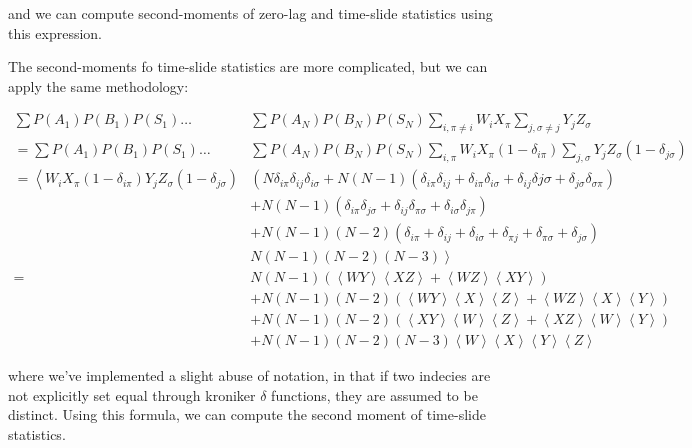 \documentclass{article}
\newcommand{\e}[1]{\left<#1\right>}
\begin{document}
and we can compute second-moments of zero-lag and time-slide statistics using this expression.

The second-moments fo time-slide statistics are more complicated, but we can apply the same methodology:

\begin{subequations}
	\begin{align}
		\sum P(A_1) P(B_1) P(S_1) \ldots & \sum P(A_N) P(B_N) P(S_N) \sum_{i,\pi\neq i} W_i X_\pi \sum_{j,\sigma\neq j} Y_j Z_\sigma \nonumber \\
		= \sum P(A_1) P(B_1) P(S_1) \ldots & \sum P(A_N) P(B_N) P(S_N) \sum_{i,\pi} W_i X_\pi \left(1-\delta_{i\pi}\right) \sum_{j,\sigma} Y_j Z_\sigma \left(1-\delta_{j\sigma}\right) \nonumber \\
		= \left< W_i X_\pi \left(1-\delta_{i\pi}\right) Y_j Z_\sigma \left(1-\delta_{j\sigma}\right) \right. & \left( N \delta_{i\pi}\delta_{ij}\delta_{i\sigma} + N\left(N-1\right)\left( \delta_{i\pi}\delta_{ij} + \delta_{i\pi}\delta_{i\sigma} + \delta_{ij}\delta{j\sigma} + \delta_{j\sigma}\delta_{\sigma\pi}\right) \right. \nonumber \\
                                      & + N\left(N-1\right)\left(\delta_{i\pi}\delta_{j\sigma} + \delta_{ij}\delta_{\pi\sigma} + \delta_{i\sigma}\delta_{j\pi} \right) \nonumber \\
                                      & + N\left(N-1\right)\left(N-2\right)\left( \delta_{i\pi} + \delta_{ij} + \delta_{i\sigma} + \delta_{\pi j} + \delta_{\pi\sigma} + \delta_{j\sigma} \right) \nonumber \\
                                      & \left. N\left(N-1\right)\left(N-2\right)\left(N-3\right) \right> \nonumber \\
		= & N\left(N-1\right)\left( \e{WY}\e{XZ} + \e{WZ}\e{XY} \right) \nonumber \\
                  & + N\left(N-1\right)\left(N-2\right) \left( \e{WY}\e{X}\e{Z} + \e{WZ}\e{X}\e{Y} \right) \nonumber \\
		  & + N\left(N-1\right)\left(N-2\right) \left( \e{XY}\e{W}\e{Z} + \e{XZ}\e{W}\e{Y} \right) \nonumber \\
		  & + N\left(N-1\right)\left(N-2\right)\left(N-3\right) \e{W}\e{X}\e{Y}\e{Z} 
	\end{align}
\end{subequations}

\noindent
where we've implemented a slight abuse of notation, in that if two indecies are not explicitly set equal through kroniker $\delta$ functions, they are assumed to be distinct.
Using this formula, we can compute the second moment of time-slide statistics.
\end{document}
